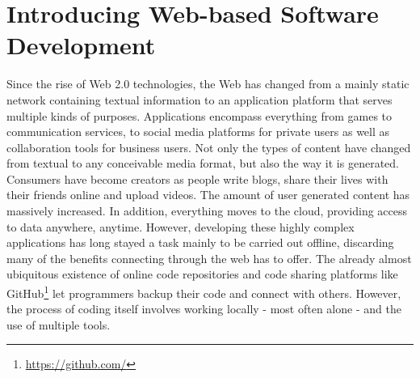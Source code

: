 \section{Introducing Web-based Software Development}
\label{sec:Introduction}

	
	
Since the rise of Web 2.0 technologies, the Web has changed from a mainly static network containing textual information
to an application platform that serves multiple kinds of purposes.
Applications encompass everything from games to communication services, to social media platforms for private users
as well as collaboration tools for business users.
Not only the types of content have changed from textual to any conceivable media format, but also the way it is generated.
Consumers have become creators as people write blogs, share their lives with their friends online and upload videos.
The amount of user generated content has massively increased. In addition, everything moves to the cloud,
providing access to data anywhere, anytime.
However, developing these highly complex applications has long stayed a task mainly to be carried out offline,
discarding many of the benefits connecting through the web has to offer.
The already almost ubiquitous existence of online code repositories and code sharing platforms like
GitHub\footnote{\url{https://github.com/}} let programmers backup their code and connect with others.
However, the process of coding itself involves working locally - most often alone - and the use of multiple tools.

